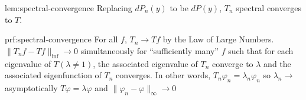 \documentclass[12pt]{article}
\theoremstyle{plain}
\begin{document}
\begin{lem}{lem:spectral-convergence}
	Replacing $ dP_n(y) $ to be $ dP(y) $, $ T_n $ spectral converges to $ T $.
\end{lem}

\begin{prf}{prf:spectral-convergence}
For all $f$, $T_n \rightarrow Tf$ by the Law of Large Numbers.
$ \|T_nf - Tf\|_{\inf} \rightarrow 0 $ simultaneously for ``sufficiently many'' $ f $ such that for each eigenvalue of $ T (\lambda \neq 1) $, the associated eigenvalue of $T_n$ converge to $\lambda$ and the associated eigenfunction of $T_n$ converges.
In other words,
$ T_n \varphi_n = \lambda_n \varphi_n $ so $ \lambda_n \rightarrow$asymptotically
$T\varphi = \lambda \varphi$ and $ \| \varphi_n- \varphi \|_{\infty} \rightarrow 0$
\end{prf}
\end{document}
